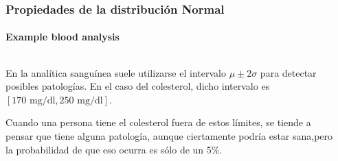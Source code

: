 \begin{frame}
\frametitle{Propiedades de la distribución Normal}
\framesubtitle{Example blood analysis}
\begin{columns}
\begin{column}{0.47\textwidth}
	En la analítica sanguínea suele utilizarse el intervalo $\mu\pm 2\sigma$ para detectar posibles patologías. 
	En el caso del colesterol, dicho intervalo es $[170\text{ mg/dl}, 250\text{ mg/dl}]$. 
	
	Cuando una persona tiene el colesterol fuera	de estos límites, se tiende a pensar que tiene alguna patología, aunque ciertamente podría estar sana,pero la	probabilidad de que eso ocurra es sólo de un 5\%.
\end{column}
\begin{column}{0.47\textwidth}
\begin{center}
\end{center}
\end{column}
\end{columns}
\end{frame}
	

